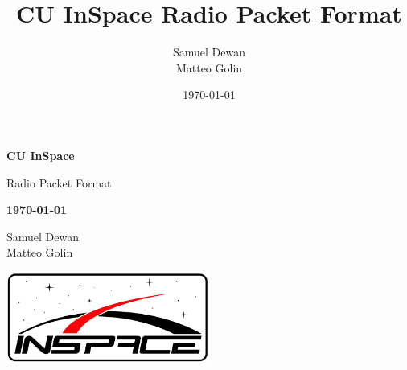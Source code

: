 \documentclass[11pt,letterpaper]{article}
\title{CU InSpace Radio Packet Format}
\author{Samuel Dewan\\Matteo Golin}
\date{\today}
\begin{document}
\begin{titlepage}
    \centering

    {\large \textbf{CU InSpace}}

    {\Huge \sffamily Radio Packet Format}

    {\large \textbf{\today}}

    Samuel Dewan \\
    Matteo Golin

    \includegraphics[width=0.5\textwidth]{logo.png}
\end{titlepage}

\tableofcontents
\clearpage


\clearpage


\clearpage


\clearpage


\clearpage


\end{document}
